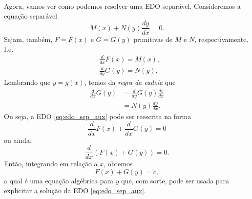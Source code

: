 Agora, vamos ver como podemos resolver uma EDO separável. Consideremos a equação separável
\begin{equation}\label{eq:edo_sep_aux}
  M(x) + N(y)\frac{dy}{dx} = 0.
\end{equation}
Sejam, também, $F=F(x)$ e $G=G(y)$ primitivas de $M$ e $N$, respectivamente. I.e.
\begin{align}
  &\frac{d}{dx}F(x) = M(x),\\
  &\frac{d}{dy}G(y) = N(y).
\end{align}
Lembrando que $y = y(x)$, temos da \emph{regra da cadeia} que
\begin{align}
  \frac{d}{dx}G(y) &= \frac{d}{dy}G(y)\frac{dy}{dx} \\
                   &= N(y)\frac{dy}{dx}.
\end{align}
Ou seja, a EDO \eqref{eq:edo_sep_aux} pode ser reescrita na forma
\begin{equation}
  \frac{d}{dx}F(x) + \frac{d}{dx}G(y) = 0
\end{equation}
ou ainda,
\begin{equation}
  \frac{d}{dx}\left(F(x) + G(y)\right) = 0.
\end{equation}
Então, integrando em relação a $x$, obtemos
\begin{equation}
  F(x) + G(y) = c,
\end{equation}
a qual é uma equação algébrica para $y$ que, com sorte, pode ser usada para explicitar a solução da EDO \eqref{eq:edo_sep_aux}.

